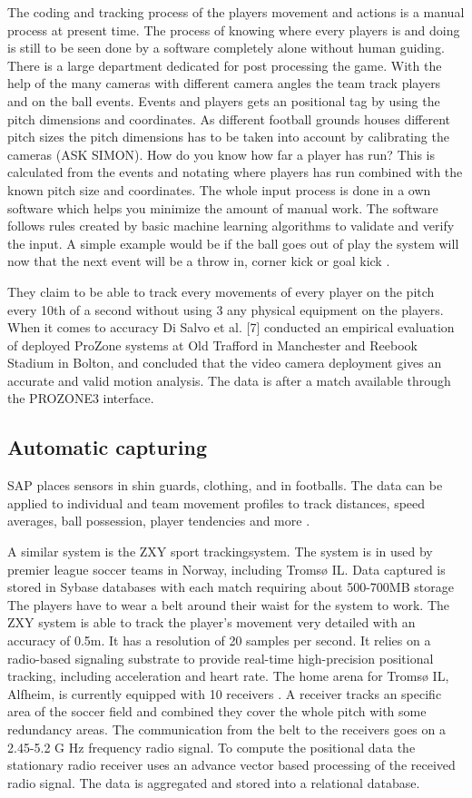 The coding and tracking process of the players movement and actions is a manual process at present time. The process of knowing where every players is and doing is still to be seen done by a software completely alone without human guiding. There is a large department dedicated for post processing the game. With the help of the many cameras with different camera angles the team track players and on the ball events. Events and players gets an positional tag by using the pitch dimensions and coordinates. As different football grounds houses different pitch sizes the pitch dimensions has to be taken into account by calibrating the cameras (ASK SIMON). How do you know how far a player has run? This is calculated from the events and notating where players has run combined with the known pitch size and coordinates. The whole input process is done in a own software which helps you minimize the amount of manual work. The software follows rules created by basic machine learning algorithms to validate and verify the input. A simple example would be if the ball goes out of play the system will now that the next event will be a throw in, corner kick or goal kick \cite{Prozone:indepth}.

They claim to be able to track every movements of every player on the pitch every 10th of a second without using 3 any physical equipment on the players. When it comes to accuracy Di Salvo et al. [7] conducted an empirical evaluation of deployed ProZone systems at Old Trafford in Manchester and Reebook Stadium in Bolton, and concluded that the video camera deployment gives an accurate and valid motion analysis. The data is after a match available through the PROZONE3 interface. 


\subsection{Automatic capturing}
SAP places sensors in shin guards, clothing, and in footballs. The data can be applied to individual and team movement profiles to track distances, speed averages, ball possession, player tendencies and more . 

A similar system is the ZXY sport trackingsystem. The system is in used by premier league soccer teams in Norway, including Tromsø IL. Data captured is stored in Sybase databases with each match requiring about 500-700MB storage  The players have to wear a belt around their waist for the system to work. The ZXY system is able to track the player’s movement very detailed with an accuracy of 0.5m. It has a resolution of 20 samples per second. It relies on a radio-based signaling substrate to provide real-time high-precision positional tracking, including acceleration and heart rate. The home arena for Tromsø IL, Alfheim, is currently equipped with 10 receivers . A receiver tracks an specific area of the soccer field and combined they cover the whole pitch with some redundancy areas. The communication from the belt to the receivers goes on a 2.45-5.2 G Hz frequency radio signal. To compute the positional data the stationary radio receiver uses an advance vector based processing of the received radio signal. The data is aggregated and stored into a relational database.


